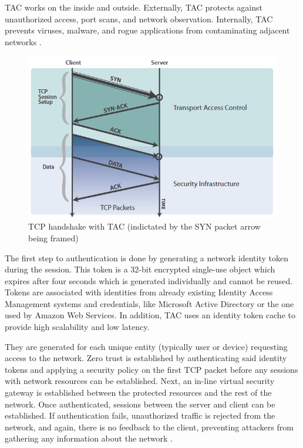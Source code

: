 TAC works on the inside and outside. Externally, TAC protects against unauthorized access, port scans, and network observation.  Internally, TAC prevents viruses, malware, and rogue applications from contaminating adjacent networks \cite{blackridge}.\par

\begin{figure}[h]
    \centering
    \includegraphics[width=\textwidth]{figures/TAC_arch.png}
    \caption{TCP handshake with TAC (indictated by the SYN packet arrow being framed)  \cite{blackridge}}
    \label{fig:TAC_arch}
\end{figure}

The first step to authentication is done by generating a network identity token during the session.  This token is a 32-bit encrypted single-use object which expires after four seconds which is generated individually and cannot be reused.  Tokens are associated with identities from already existing Identity Access Management systems and credentials, like Microsoft Active Directory or the one used by Amazon Web Services. In addition, TAC uses an identity token cache to provide high scalability and low latency. \par 
They are generated for each unique entity (typically user or device) requesting access to the network.  Zero trust is established by authenticating said identity tokens and applying a security policy on the first TCP packet before any sessions with network resources can be established.  Next, an in-line virtual security gateway is established between the protected resources and the rest of the network.
Once authenticated, sessions between the server and client can be established.  If authentication fails, unauthorized traffic is rejected from the network, and again, there is no feedback to the client, preventing attackers from gathering any information about the network \cite{blackridge}. \\\par

